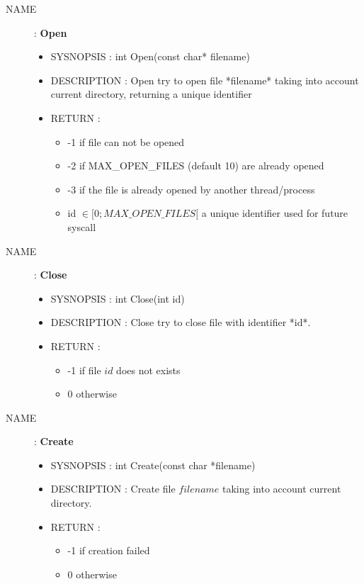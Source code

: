 \begin{description}
    \item [NAME] : \textbf{Open}
        \begin{itemize}
            \item SYSNOPSIS : int Open(const char* filename)
            \item DESCRIPTION :
                Open try to open file *filename* taking into account current directory,
                returning a unique identifier
            \item RETURN :
                \begin{itemize}
                    \item -1 if file can not be opened
                    \item -2 if MAX\_OPEN\_FILES (default 10) are already opened
                    \item -3 if the file is already opened by another thread/process
                    \item id $\in [0; MAX\_OPEN\_FILES[$ a unique identifier used for future syscall
                        \end{itemize}
                \end{itemize}

            \item [NAME] : \textbf{Close}
                \begin{itemize}
                    \item SYSNOPSIS : int Close(int id)
                    \item DESCRIPTION :
                        Close try to close file with identifier *id*.
                    \item RETURN :
                        \begin{itemize}
                            \item -1 if file $id$ does not exists
                            \item 0 otherwise
                        \end{itemize}
                \end{itemize}

            \item [NAME] : \textbf{Create}
                \begin{itemize}
                    \item SYSNOPSIS : int Create(const char *filename)
                    \item DESCRIPTION :
                        Create file $filename$ taking into account current directory.
                    \item RETURN :
                        \begin{itemize}
                            \item -1 if creation failed
                            \item 0 otherwise
                        \end{itemize}
                \end{itemize}


\end{description}

